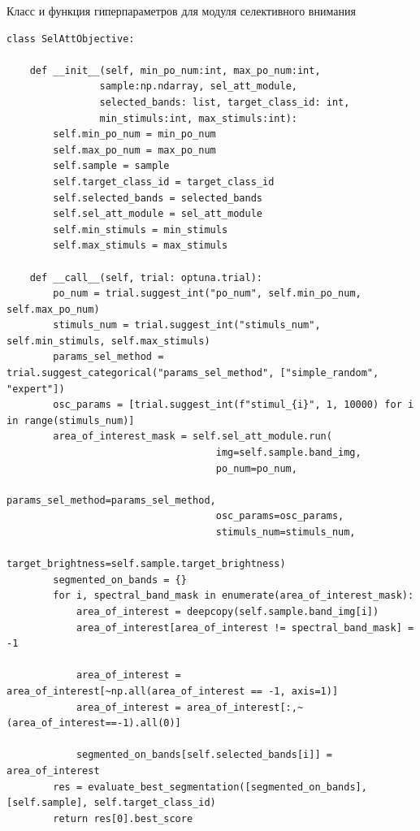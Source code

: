\documentclass[14pt, russian]{scrartcl}
\begin{document}
\begin{listing}[H]
    \caption{Класс и функция гиперпараметров для модуля селективного внимания}
    \label{lst:contour_extr_sobel}
    \begin{verbatim}
class SelAttObjective:

    def __init__(self, min_po_num:int, max_po_num:int,
                sample:np.ndarray, sel_att_module,
                selected_bands: list, target_class_id: int,
                min_stimuls:int, max_stimuls:int):
        self.min_po_num = min_po_num
        self.max_po_num = max_po_num
        self.sample = sample
        self.target_class_id = target_class_id
        self.selected_bands = selected_bands
        self.sel_att_module = sel_att_module
        self.min_stimuls = min_stimuls
        self.max_stimuls = max_stimuls

    def __call__(self, trial: optuna.trial):
        po_num = trial.suggest_int("po_num", self.min_po_num, self.max_po_num)
        stimuls_num = trial.suggest_int("stimuls_num", self.min_stimuls, self.max_stimuls)
        params_sel_method = trial.suggest_categorical("params_sel_method", ["simple_random", "expert"])
        osc_params = [trial.suggest_int(f"stimul_{i}", 1, 10000) for i in range(stimuls_num)]
        area_of_interest_mask = self.sel_att_module.run(
                                    img=self.sample.band_img, 
                                    po_num=po_num, 
                                    params_sel_method=params_sel_method,
                                    osc_params=osc_params,
                                    stimuls_num=stimuls_num,
                                    target_brightness=self.sample.target_brightness)       
        segmented_on_bands = {}
        for i, spectral_band_mask in enumerate(area_of_interest_mask):  
            area_of_interest = deepcopy(self.sample.band_img[i])
            area_of_interest[area_of_interest != spectral_band_mask] = -1

            area_of_interest = area_of_interest[~np.all(area_of_interest == -1, axis=1)]
            area_of_interest = area_of_interest[:,~(area_of_interest==-1).all(0)]

            segmented_on_bands[self.selected_bands[i]] = area_of_interest
        res = evaluate_best_segmentation([segmented_on_bands], [self.sample], self.target_class_id)
        return res[0].best_score
    \end{verbatim}
\end{listing}
\end{document}
